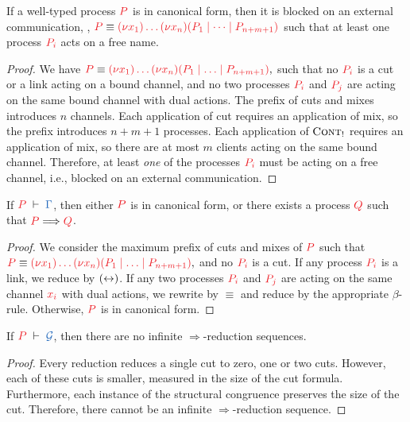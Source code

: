 \documentclass[envcountsame,UKenglish]{llncs}
\begin{document}
\begin{lemma}
  If a well-typed process $\tm{P}$ is in canonical form, then it is blocked on
  an external communication, \ie,
  $\tm{P}\equiv\tm{\piNew{x_1}{\dots\piNew{x_n}{(P_1\mid\dots\mid P_{n+m+1})}}}$
  such that at least one process $\tm{P_i}$ acts on a free name.
\end{lemma}
\begin{proof}
  We have
  \(
  \tm{P} \equiv \tm{\piNew{x_1}{\dots\piNew{x_n}{(P_1 \ppar \dots \ppar P_{n+m+1})}}},
  \)
  such that no $\tm{P_i}$ is a cut or a link acting on a bound channel, and no two processes $\tm{P_i}$ and $\tm{P_j}$ are acting on the same bound channel with dual actions. The prefix of cuts and mixes introduces $n$ channels. Each application of cut requires an application of mix, so the prefix introduces $n+m+1$ processes. Each application of $\textsc{Cont}_{!}$ requires an application of mix, so there are at most $m$ clients acting on the same bound channel. Therefore, at least \emph{one} of the processes $\tm{P_i}$ must be acting on a free channel, i.e., blocked on an external communication.
\end{proof}
\begin{theorem}[Progress]\label{thm:nodcap-progress}
  If $\seq[P]{\Gamma}$, then either $\tm{P}$ is in canonical form, or there exists a process $\tm{Q}$ such that $\tm{P}\Longrightarrow\tm{Q}$.
\end{theorem} 
\begin{proof}
  We consider the maximum prefix of cuts and mixes of $\tm{P}$ such that
  \(
  \tm{P} \equiv \tm{\piNew{x_1}{\dots\piNew{x_n}{(P_1 \ppar \dots \ppar P_{n+m+1})}}},
  \)
  and no $\tm{P_i}$ is a cut. If any process $\tm{P_i}$ is a link, we reduce by $({\leftrightarrow})$. If any two processes $\tm{P_i}$ and $\tm{P_j}$ are acting on the same channel $\tm{x_i}$ with dual actions, we rewrite by $\equiv$ and reduce by the appropriate $\beta$-rule. Otherwise, $\tm{P}$ is in canonical form.
\end{proof}
\begin{theorem}[Termination]\label{thm:nodcap-termination}
  If $\seq[P]{\mathcal{G}}$, then there are no infinite $\Longrightarrow$-reduction sequences.
\end{theorem} 
\begin{proof}
  Every reduction reduces a single cut to zero, one or two cuts. However, each of these cuts is smaller, measured in the size of the cut formula. Furthermore, each instance of the structural congruence preserves the size of the cut. Therefore, there cannot be an infinite $\Longrightarrow$-reduction sequence.
\end{proof}
\end{document}
